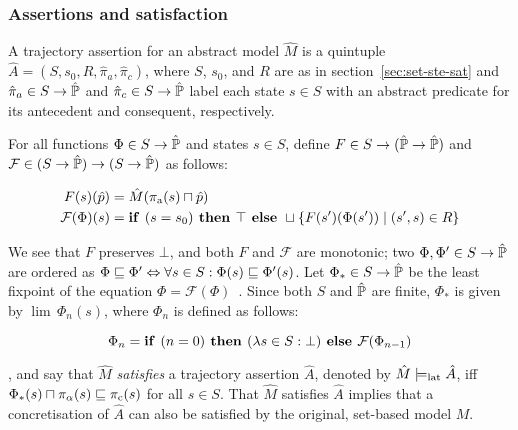 \subsubsection{Assertions and satisfaction} \label{sec:lat-ste-sat}

A trajectory assertion for an abstract model $\hat M$ is a quintuple $\hat{A} = (S, s_{0}, R, \hat{\pi}_{a}, \hat{\pi}_{c})$, where $S$, $s_{0}$, and $R$ are as in section~\ref{sec:set-ste-sat} and $\hat{\pi}_{a} \in S \rightarrow \hat{\mathbb{P}}$ and $\hat{\pi}_{c} \in S \rightarrow \hat{\mathbb{P}}$ label each state $s \in S$ with an abstract predicate for its antecedent and consequent, respectively. 

For all functions $\Phi \in S \rightarrow \hat{\mathbb{P}}$ and states $s \in S$, define $F \in S \rightarrow (\hat{\mathbb{P}} \rightarrow \hat{\mathbb{P}})$ and $\mathcal{F} \in (S \rightarrow \hat{\mathbb{P}}) \rightarrow (S \rightarrow \hat{\mathbb{P}})$ as follows:

\begin{align}
F(s)(\hat p) &= \hat M(\operatorname{\pi_{\textrm{a}}}(s) \sqcap \hat p) \\
\mathcal{F}(\Phi)(s) &= \textrm{\textbf{if }} (s = s_{0}) \textrm{\textbf{ then }} \top \textrm{\textbf{ else }} \sqcup \{ F(s')(\Phi(s')) \mid (s',s) \in R \}
\end{align}

\noindent We see that $F$ preserves $\bot$, and both $F$ and $\mathcal{F}$ are monotonic; two $\Phi, \Phi' \in S \rightarrow \hat{\mathbb{P}}$ are ordered as $\Phi \sqsubseteq \Phi' \Leftrightarrow \forall s \in S : \Phi(s) \sqsubseteq \Phi'(s)$. Let $\Phi_{*} \in S \rightarrow \hat{\mathbb{P}}$ be the least fixpoint of the equation $\Phi = \mathcal{F}(\Phi)$~\cite{davey2002}. Since both $S$ and $\hat{\mathbb{P}}$ are finite, $\Phi_{*}$ is given by $\lim \, \Phi_{n}(s)$, where $\Phi_{n}$ is defined as follows:

\begin{equation}
\Phi_{n} = \textrm{\textbf{if }} (n = 0) \textrm{\textbf{ then }} (\lambda s \in S : \bot) \textrm{\textbf{ else }} \mathcal{F}(\Phi_{n-1})
\end{equation}

\noindent {}, and say that $\hat M$ \textit{satisfies} a trajectory assertion $\hat{A}$, denoted by $\hat M \models_{\textrm{lat}} \hat{A}$, iff $\Phi_{*}(s) \sqcap \pi_{\alpha}(s) \sqsubseteq \operatorname{\pi_{\textrm{c}}}(s)$ for all $s \in S$. That $\hat M$ satisfies $\hat{A}$ implies that a concretisation of $\hat{A}$ can also be satisfied by the original, set-based model $M$.

